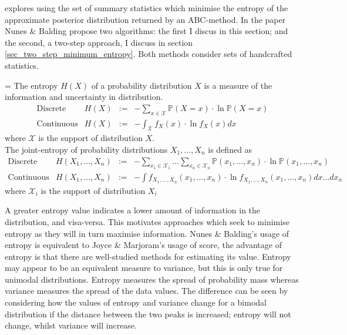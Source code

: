 \documentclass[11pt,a4paper]{article}
\newcommand*{\prob}{\mathbb{P}}
\theoremstyle{break}
\begin{document}
  \par \cite[]{on_optimal_selection_of_summary_stats_for_ABC} explores using the set of summary statistics which minimise the entropy of the approximate posterior distribution returned by an ABC-method. In the paper Nunes \& Balding propose two algorithms: the first I discus in this section; and the second, a two-step approach, I discuss in section \ref{sec_two_step_minimum_entropy}. Both methods consider sets of handcrafted statistics.

  \begin{box_definition}
    \everymath={\displaystyle}
    The entropy $H(X)$ of a probability distribution $X$ is a measure of the information and uncertainty in distribution.
    \[\begin{array}{rrcl}
      \text{Discrete}&H(X)&:=&-\sum_{x\in\mathcal{X}}\prob(X=x)\cdot\ln\prob(X=x)\\
      \text{Continuous}&H(X)&:=&-\int_{\mathcal{X}}f_X(x)\cdot\ln f_X(x)dx
    \end{array}\]
    where $\mathcal{X}$ is the support of distribution $X$.\\
    The joint-entropy of probability distributions $X_1,\dots,X_n$ is defined as
    \[\begin{array}{rrcl}
      \text{Discrete}&H(X_1,\dots,X_n)&:=&-\sum_{x_1\in\mathcal{X}_1}\dots\sum_{x_n\in\mathcal{X}_n}\prob(x_1,\dots,x_n)\cdot\ln\prob(x_1,\dots,x_n)\\
      \text{Continuous}&H(X_1,\dots,X_n)&:=&-\int f_{X_1,\dots,X_n}(x_1,\dots,x_n)\cdot\ln f_{X_1,\dots,X_n}(x_1,\dots,x_n)dx\dots dx_n
    \end{array}\]
    where $\mathcal{X}_i$ is the support of distribution $X_i$
  \end{box_definition}

  \par A greater entropy value indicates a lower amount of information in the distribution, and visa-versa. This motivates approaches which seek to minimise entropy as they will in turn maximise information. Nunes \& Balding's usage of entropy is equivalent to Joyce \& Marjoram's usage of score, the advantage of entropy is that there are well-studied methods for estimating its value. Entropy may appear to be an equivalent measure to variance, but this is only true for unimodal distributions. Entropy measures the spread of probability mass whereas variance measures the spread of the data values. The difference can be seen by considering how the values of entropy and variance change for a bimodal distribution if the distance between the two peaks is increased; entropy will not change, whilst variance will increase.
\end{document}
